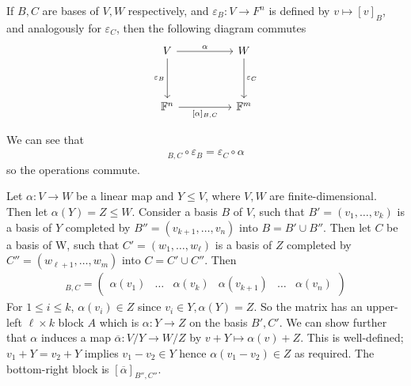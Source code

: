 \begin{remark}
    If $B,C$ are bases of $V,W$ respectively, and $\varepsilon_B \colon V \to F^n$ is defined by $v \mapsto [v]_B$, and analogously for $\varepsilon_C$, then the following diagram \color{blue}commutes\color{black}
    \[\begin{tikzcd}
        V && W \\
        \\
        {\mathbb{F}^n} && {\mathbb{F}^m}
        \arrow["\alpha", from=1-1, to=1-3]
        \arrow["{\varepsilon_C}", from=1-3, to=3-3]
        \arrow["{[\alpha]_{B,C}}"', from=3-1, to=3-3]
        \arrow["{\varepsilon_B}"', from=1-1, to=3-1]
    \end{tikzcd}\]

    We can see that
    \begin{align*}
        [\alpha]_{B,C} \circ \varepsilon_B = \varepsilon_C \circ \alpha
    \end{align*}
    so the operations commute.
\end{remark}
\begin{example}
    Let $\alpha \colon V \to W$ be a linear map and $Y \leq V$, where $V, W$ are finite-dimensional.
    Then let $\alpha(Y) = Z \leq W$.
    Consider a basis $B$ of $V$, such that $B' = (v_1, \dots, v_k)$ is a basis of $Y$ completed by $B'' = (v_{k+1}, \dots, v_n)$ into $B = B' \cup B''$.
    Then let $C$ be a basis of W, such that $C' = (w_1, \dots, w_\ell)$ is a basis of $Z$ completed by $C'' = (w_{\ell + 1}, \dots, w_m)$ into $C = C' \cup C''$.
    Then
    \begin{align*}
        [\alpha]_{B,C} = \begin{pmatrix}
            \alpha(v_1) & \dots & \alpha(v_k) & \alpha(v_{k+1}) & \dots & \alpha(v_n)
        \end{pmatrix}
    \end{align*}
    For $1 \leq i \leq k$, $\alpha(v_i) \in Z$ since $v_i \in Y, \alpha(Y) = Z$.
    So the matrix has an upper-left $\ell \times k$ block $A$ which is $\alpha \colon Y \to Z$ on the basis $B', C'$.
    We can show further that $\alpha$ induces a map $\overline{\alpha} \colon V / Y \to W / Z$ by $v + Y \mapsto \alpha(v) + Z$.
    This is well-defined; $v_1 + Y = v_2 + Y$ implies $v_1 - v_2 \in Y$ hence $\alpha(v_1 - v_2) \in Z$ as required.
    The bottom-right block is $[\overline{\alpha}]_{B'', C''}$.
\end{example}

